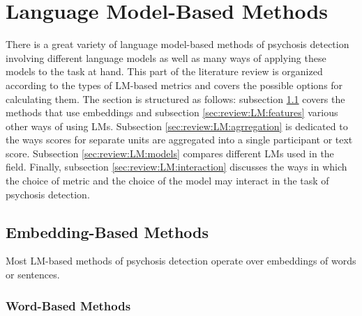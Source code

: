 
\section{Language Model-Based Methods}
\label{sec:review:LM}

There is a great variety of language model-based methods of psychosis detection involving different language models as well as many ways of applying these models to the task at hand. This part of the literature review is organized according to the types of LM-based metrics and covers the possible options for calculating them. The section is structured as follows: subsection \ref{sec:review:LM:embeddings} covers the methods that use embeddings and subsection \ref{sec:review:LM:features} various other ways of using LMs. Subsection \ref{sec:review:LM:agrregation} is dedicated to the ways scores for separate units are aggregated into a single participant or text score. Subsection \ref{sec:review:LM:models} compares different LMs used in the field. Finally, subsection \ref{sec:review:LM:interaction} discusses the ways in which the choice of metric and the choice of the model may interact in the task of psychosis detection.

\subsection{Embedding-Based Methods}
\label{sec:review:LM:embeddings}
Most LM-based methods of psychosis detection operate over embeddings of words or sentences. 

\subsubsection{Word-Based Methods}

